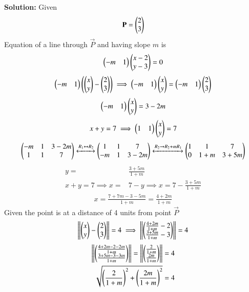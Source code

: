 \documentclass[journal]{IEEEtran}
\begin{document}
\textbf{Solution:}  
Given  
\begin{align}
\mathbf{P}=\begin{pmatrix}2\\3\end{pmatrix}
\end{align}
Equation of a line through $\vec{P}$ and having slope $m$ is
\begin{align}
 \begin{pmatrix}-m & 1\end{pmatrix}\begin{pmatrix}x-2 \\ y-3\end{pmatrix}=0  
 \end{align}
 \begin{align}
 \begin{pmatrix}-m & 1\end{pmatrix}\left(\begin{pmatrix}x\\y\end{pmatrix}-\begin{pmatrix}2\\3\end{pmatrix}\right) \implies \begin{pmatrix}-m & 1\end{pmatrix}\begin{pmatrix}x\\y\end{pmatrix}=\begin{pmatrix}-m & 1\end{pmatrix}\begin{pmatrix}2\\3\end{pmatrix}
\end{align}
\begin{align}
\begin{pmatrix}-m & 1\end{pmatrix}\begin{pmatrix}x\\y\end{pmatrix}=3-2m
\end{align}
\begin{align}
  x+y=7 \implies  \begin{pmatrix}1 & 1\end{pmatrix}\begin{pmatrix}x\\y\end{pmatrix}=7
\end{align}
\begin{align}
\begin{pmatrix}-m & 1 & 3-2m \\ 1 &1 & 7\end{pmatrix} \xleftrightarrow{R_1\leftrightarrow R_2} \begin{pmatrix}1 &1 & 7 \\ -m & 1 & 3-2m\end{pmatrix} \xleftrightarrow{R_2\rightarrow R_2+mR_1} 
\begin{pmatrix}1 & 1& 7 \\0 & 1+m & 3+5m\end{pmatrix}
\end{align}
\begin{align}
y=&\frac{3+5m}{1+m}\\
x+y=7\implies x=&7-y \implies x=7-\frac{3+5m}{1+m}
\end{align}
\begin{align}
x=\frac{7+7m-3-5m}{1+m}=\frac{4+2m}{1+m}
\end{align}
Given the point is at a distance of 4 units from point $\vec{P}$
\begin{align}
  \left\lVert\begin{pmatrix}x\\y\end{pmatrix}-\begin{pmatrix}2\\3\end{pmatrix}\right\rVert=4 \implies \left\lVert\begin{pmatrix}\frac{4+2m}{1+m}-2\\\frac{3+5m}{1+m}-3\end{pmatrix}\right\rVert=4
\end{align}
\begin{align}
\left\lVert\begin{pmatrix}\frac{4+2m-2-2m}{1+m}\\ \frac{3+5m-3-3m}{1+m}\end{pmatrix}\right\rVert=\left\lVert\begin{pmatrix}\frac{2}{1+m}\\ \frac{2m}{1+m}\end{pmatrix}\right\rVert=4\\
\sqrt{\left(\frac{2}{1+m}\right)^2+{\left(\frac{2m}{1+m}\right)^2}}=4 
\end{align}
\end{document}
